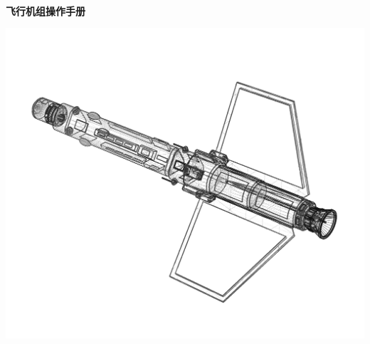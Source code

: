\begin{titlepage}
	\begin{center}
		\vspace{1cm}
		{}\\
		\vspace{1.5cm}
		{\Large \textbf{\textsf{飞行机组操作手册}}}\\
		\vspace{2.5cm}
		\begin{center}
			\includegraphics[width=0.7\linewidth]{Picture/F9_titlepic}
		\end{center}
		\vfill
		\vspace{1.8cm}
		\doclicenseThis
	\end{center}
\end{titlepage}